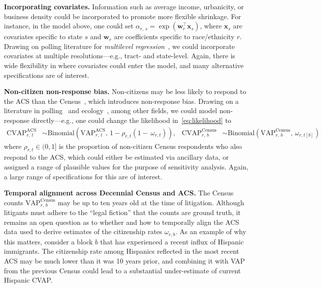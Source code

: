 \documentclass[11pt]{article}
\begin{document}
\textbf{Incorporating covariates.} Information such as average income, urbanicity, or business density could be incorporated to promote more flexible shrinkage. For instance, in the model above, one could set $\alpha_{r,\,s} = \exp\left(\boldsymbol{w}_r^\top \boldsymbol{x}_{s}\right)$, where $\boldsymbol{x}_s$ are covariates specific to state $s$ and $\boldsymbol{w}_r$ are coefficients specific to race/ethnicity $r$. Drawing on polling literature for \textit{multilevel regression}~\citep{park2004bayesian}, we could incorporate covariates at multiple resolutions---e.g., tract- and state-level. Again, there is wide flexibility in where covariates could enter the model, and many alternative specifications are of interest.

\textbf{Non-citizen non-response bias.} Non-citizens may be less likely to respond to the ACS than the Census~\citep{rothbaum2021addressing}, which introduces non-response bias. Drawing on a literature in polling~\citep{little1982models} and ecology~\citep{mackenzie2002estimating}, among other fields, we could model non-response directly---e.g., one could change the likelihood in~\cref{eq:likelihood} to
\begin{align} 
\textrm{CVAP}^{\textrm{ACS}}_{r,\,t} &\sim \textrm{Binomial}\left(\textrm{VAP}^{\textrm{ACS}}_{r,\,t},\, 1 - \rho_{r,t}(1-\,\omega_{r,t})\right), & \textrm{CVAP}^{\textrm{Census}}_{r,\,b} &\sim \textrm{Binomial}\left(\textrm{VAP}^{\textrm{Census}}_{r,\,b},\, \omega_{r,t[b]}\right)
\end{align}
where $\rho_{r,t} \in (0,1]$ is the proportion of non-citizen Census respondents who also respond to the ACS, which could either be estimated via ancillary data, or assigned a range of plausible values for the purpose of sensitivity analysis. Again, a large range of specifications for this are of interest.

\textbf{Temporal alignment across Decennial Census and ACS.}
The Census counts $\textrm{VAP}^{\textrm{Census}}_{r,\,b}$ may be up to ten years old at the time of litigation. Although litigants must adhere to the ``legal fiction'' that the counts are ground truth, it remains an open question as to whether and how to temporally align the ACS data used to derive estimates of the citizenship rates $\omega_{r,b}$. As an example of why this matters, consider a block $b$ that has experienced a recent influx of Hispanic immigrants. The citizenship rate among Hispanics reflected in the most recent ACS may be much lower than it was 10 years prior, and combining it with VAP from the previous Census could lead to a substantial under-estimate of current Hispanic CVAP.  
\end{document}

